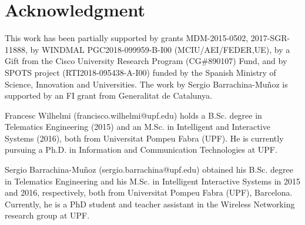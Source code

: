 \documentclass[journal]{IEEEtran}
\begin{document}
\section*{Acknowledgment}

This work has been partially supported by grants MDM-2015-0502, 2017-SGR-11888, by WINDMAL PGC2018-099959-B-I00 (MCIU/AEI/FEDER,UE), by a Gift from the Cisco University Research Program (CG\#890107) Fund, and by SPOTS project (RTI2018-095438-A-I00) funded by the Spanish Ministry of Science, Innovation and Universities. The work by Sergio Barrachina-Mu\~noz is supported by an FI grant from Generalitat de Catalunya.


\ifCLASSOPTIONcaptionsoff
  \newpage
\fi






\begin{IEEEbiographynophoto}{Francesc Wilhelmi}
(francisco.wilhelmi@upf.edu) holds a B.Sc. degree in Telematics Engineering (2015) and an M.Sc. in Intelligent and Interactive Systems (2016), both from Universitat Pompeu Fabra (UPF). He is currently pursuing a Ph.D. in Information and Communication Technologies at UPF.
\end{IEEEbiographynophoto}

\begin{IEEEbiographynophoto}{Sergio Barrachina-Mu\~noz}
(sergio.barrachina@upf.edu) obtained his B.Sc. degree in Telematics Engineering and his M.Sc. in Intelligent Interactive Systems in 2015 and 2016, respectively, both from Universitat Pompeu Fabra (UPF), Barcelona. Currently, he is a PhD student and teacher assistant in the Wireless Networking research group at UPF.
\end{IEEEbiographynophoto}
\end{document}
